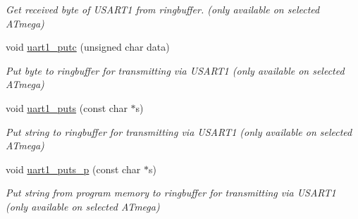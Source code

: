 \begin{DoxyCompactItemize}
\begin{DoxyCompactList}\small\item\em Get received byte of U\+S\+A\+R\+T1 from ringbuffer. (only available on selected A\+Tmega) \end{DoxyCompactList}\item 
void \hyperlink{a00008_gab465f689d197fadfbacc374fc9411154}{uart1\+\_\+putc} (unsigned char data)
\begin{DoxyCompactList}\small\item\em Put byte to ringbuffer for transmitting via U\+S\+A\+R\+T1 (only available on selected A\+Tmega) \end{DoxyCompactList}\item 
void \hyperlink{a00008_ga5568f8f3913b218fd4d0346af78831b2}{uart1\+\_\+puts} (const char $\ast$s)
\begin{DoxyCompactList}\small\item\em Put string to ringbuffer for transmitting via U\+S\+A\+R\+T1 (only available on selected A\+Tmega) \end{DoxyCompactList}\item 
void \hyperlink{a00008_ga1e8074d0a2d5922601c5db2f9777ba79}{uart1\+\_\+puts\+\_\+p} (const char $\ast$s)
\begin{DoxyCompactList}\small\item\em Put string from program memory to ringbuffer for transmitting via U\+S\+A\+R\+T1 (only available on selected A\+Tmega) \end{DoxyCompactList}\end{DoxyCompactItemize}
